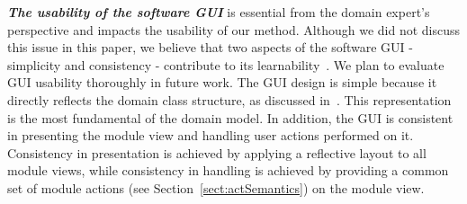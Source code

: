 \textit{\textbf{The usability of the software GUI}} is essential from the domain expert's perspective and impacts the usability of our method. Although we did not discuss this issue in this paper, we believe that two aspects of the software GUI - simplicity and consistency - contribute to its learnability~\cite{folmer_architecting_2004}. We plan to evaluate GUI usability thoroughly in future work. The GUI design is simple because it directly reflects the domain class structure, as discussed in~\cite{le_domain_2018}. This representation is the most fundamental of the domain model. In addition, the GUI is consistent in presenting the module view and handling user actions performed on it. Consistency in presentation is achieved by applying a reflective layout to all module views, while consistency in handling is achieved by providing a common set of module actions (see Section~\ref{sect:actSemantics}) on the module view.

